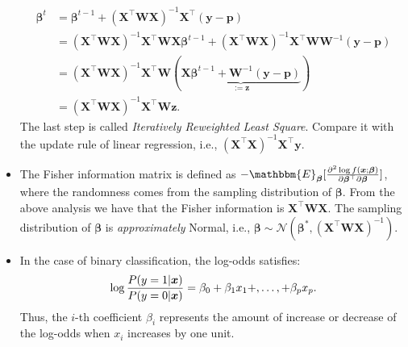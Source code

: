 \begin{itemize}
                    \begin{equation}
                        \begin{aligned}
                            \bm{\beta}^t & = \bm{\beta}^{t-1} + \left(\bm{X}^\top \bm{W} \bm{X}\right)^{-1} \bm{X}^\top (\bm{y} - \bm{p}) \\
                                         & = \left(\bm{X}^\top \bm{W} \bm{X}\right)^{-1}\bm{X}^\top \bm{W} \bm{X} \bm{\beta}^{t-1} + \left(\bm{X}^\top \bm{W} \bm{X}\right)^{-1} \bm{X}^\top \bm{W} \bm{W}^{-1} (\bm{y} - \bm{p}) \\
                                         & = \left(\bm{X}^\top \bm{W} \bm{X}\right)^{-1}\bm{X}^\top \bm{W} \left( \underbrace{\bm{X}\bm{\beta}^{t-1} + \bm{W}^{-1}(\bm{y} - \bm{p})}_{:=\bm{z}} \right) \\
                                         & = \left(\bm{X}^\top \bm{W} \bm{X}\right)^{-1}\bm{X}^\top \bm{W} \bm{z}.
                        \end{aligned}
                    \end{equation}
                The last step is called \emph{Iteratively Reweighted Least Square}.
                Compare it with the update rule of linear regression, i.e., $\left( \bm{X}^\top \bm{X}\right)^{-1} \bm{X}^\top \bm{y}$.
                \item The Fisher information matrix is defined as $-\mathbbm{E}_{\bm{\beta}}[ \frac{\partial^2 \log f(\bm{x}; \bm{\beta})}{\partial \bm{\beta}^\top \partial \bm{\beta}} ]$, where the randomness comes from the sampling distribution of $\bm{\beta}$.
                From the above analysis we have that the Fisher information is $\bm{X}^\top \bm{W} \bm{X}$.
                The sampling distribution of $\bm{\beta}$ is \emph{approximately} Normal, i.e., $\bm{\beta} \sim \mathcal{N}(\bm{\beta}^\ast, \left(\bm{X}^\top \bm{W} \bm{X}\right)^{-1})$.
                \item In the case of binary classification, the log-odds satisfies:
                    \begin{equation}
                        \log \frac{P(y=1 | \bm{x})}{P(y=0 | \bm{x})}  = \beta_0 + \beta_1 x_1 +, \ldots, + \beta_p x_p.
                    \end{equation}
                Thus, the $i$-th coefficient $\beta_i$ represents the amount of increase or decrease of the log-odds when $x_i$ increases by one unit.
            \end{itemize}
            
